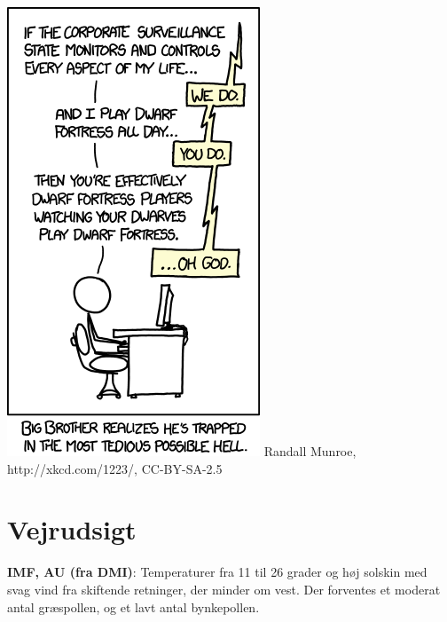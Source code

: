\begin{minipage}[b]{0.95\linewidth}
\begin{minipage}[t]{0.47\textwidth}
\vspace{1mm}
\includegraphics[width=\linewidth]{dwarf_fortress.png}
\tiny Randall Munroe, http://xkcd.com/1223/, CC-BY-SA-2.5

\end{minipage}%
\hfill\begin{minipage}[t]{0.47\textwidth}
\vspace{2mm}
\section*{Vejrudsigt}
\textbf{IMF, AU (fra DMI)}: Temperaturer fra 11 til 26 grader og høj solskin med svag vind fra skiftende retninger, der minder om vest. Der forventes et moderat antal græspollen, og et lavt antal bynkepollen.


\end{minipage}
\end{minipage}
